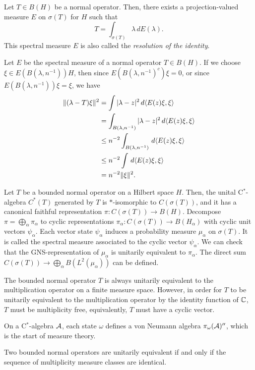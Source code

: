 \documentclass{../../large}
\begin{document}
\begin{prb}
Let $T\in B(H)$ be a normal operator.
Then, there exists a projection-valued measure $E$ on $\sigma(T)$ for $H$ such that
\[T=\int_{\sigma(T)}\lambda\,dE(\lambda).\]
This spectral measure $E$ is also called the \emph{resolution of the identity}.
\end{prb}


Let $E$ be the spectral measure of a normal operator $T\in B(H)$.
If we choose $\xi\in E(B(\lambda,n^{-1}))H$, then since $E(B(\lambda,n^{-1})^c)\xi=0$, or since $E(B(\lambda,n^{-1}))\xi=\xi$, we have
\begin{align*}
\|(\lambda-T)\xi\|^2
&=\int|\lambda-z|^2\,d\langle E(z)\xi,\xi\rangle\\
&=\int_{B(\lambda,n^{-1})}|\lambda-z|^2\,d\langle E(z)\xi,\xi\rangle\\
&\le n^{-2}\int_{B(\lambda,n^{-1})}\,d\langle E(z)\xi,\xi\rangle\\
&\le n^{-2}\int\,d\langle E(z)\xi,\xi\rangle\\
&=n^{-2}\|\xi\|^2.
\end{align*}

\begin{prb}
Let $T$ be a bounded normal operator on a Hilbert space $H$.
Then, the unital C$^*$-algebra $C^*(T)$ generated by $T$ is $*$-isomorphic to $C(\sigma(T))$, and it has a canonical faithful representation $\pi:C(\sigma(T))\to B(H)$.
Decompose $\pi=\bigoplus_\alpha\pi_\alpha$ to cyclic representations $\pi_\alpha:C(\sigma(T))\to B(H_\alpha)$ with cyclic unit vectors $\psi_\alpha$.
Each vector state $\psi_\alpha$ induces a probability measure $\mu_\alpha$ on $\sigma(T)$.
It is called the spectral measure associated to the cyclic vector $\psi_\alpha$.
We can check that the GNS-representation of $\mu_\alpha$ is unitarily equivalent to $\pi_\alpha$.
The direct sum $C(\sigma(T))\to\bigoplus_\alpha B(L^2(\mu_\alpha))$ can be defined.

The bounded normal operator $T$ is always unitarily equivalent to the multiplication operator on a finite measure space.
However, in order for $T$ to be unitarily equivalent to the multiplication operator by the identity function of $\mathbb{C}$, $T$ must be multiplicity free, equivalently, $T$ must have a cyclic vector.
\end{prb}

On a C$^*$-algebra $\mathcal{A}$, each state $\omega$ defines a von Neumann algebra $\pi_\omega(\mathcal{A})''$, which is the start of measure theory.

Two bounded normal operators are unitarily equivalent if and only if the sequence of multiplicity measure classes are identical.
\end{document}
